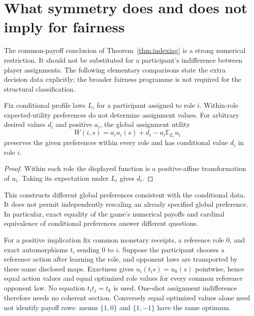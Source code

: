 \section{What symmetry does and does not imply for fairness}\label{sec:consequences}
The common-payoff conclusion of Theorem~\ref{thm:indexing} is a strong
numerical restriction. It should not be substituted for a participant's
indifference between player assignments. The following elementary comparisons
state the extra decision data explicitly; the broader fairness programme is
not required for the structural classification.

\begin{proposition}\label{prop:assignment-calibration}
Fix conditional profile laws $L_i$ for a participant assigned to role $i$.
Within-role expected-utility preferences do not determine assignment values.
For arbitrary desired values $d_i$ and positive $a_i$, the global assignment
utility
\[
 W(i,s)=a_i u_i(s)+d_i-a_i\mathbb E_{L_i}u_i
\]
preserves the given preferences within every role and has conditional value
$d_i$ in role $i$.
\end{proposition}
\begin{proof}
Within each role the displayed function is a positive-affine transformation
of $u_i$. Taking its expectation under $L_i$ gives $d_i$.
\end{proof}
This constructs different global preferences consistent with the conditional
data. It does not permit independently rescaling an already specified global
preference. In particular, exact equality of the game's numerical payoffs and
cardinal equivalence of conditional preferences answer different questions.

For a positive implication fix common monetary receipts, a reference role 0,
and exact automorphisms $t_i$ sending 0 to $i$. Suppose the participant chooses
a reference action after learning the role, and opponent laws are transported
by these same disclosed maps. Exactness gives
$u_i(t_i s)=u_0(s)$ pointwise, hence equal action values and equal optimized
role values for every common reference opponent law. No equation
$t_i t_j=t_k$ is used. One-shot assignment indifference therefore needs no
coherent section. Conversely equal optimized values alone need not identify
payoff rows: menus $\{1,0\}$ and $\{1,-1\}$ have the same optimum.

